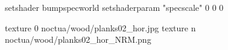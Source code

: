 setshader bumpspecworld
setshaderparam "specscale" 0 0 0

texture 0 noctua/wood/planks02_hor.jpg
texture n noctua/wood/planks02_hor_NRM.png
